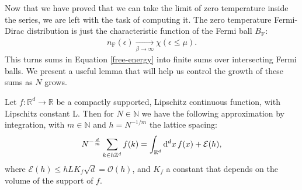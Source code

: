 Now that we have proved that we can take the limit of zero temperature inside the series, we
are left with the task of computing it. The zero temperature Fermi-Dirac distribution is just
the characteristic function of the Fermi ball $B_{\mathrm{F}}$:
\begin{align*}
	n_{\mathrm{F}}(\epsilon) \xrightarrow[\beta\to\infty]{} \chi(\epsilon\leq\mu).
\end{align*}
This turns sums in Equation \eqref{free-energy} into finite sums over intersecting Fermi
balls. We present a useful lemma that will help us control the growth of these sums as $N$
grows.

\begin{lemma}
	\label{riemann}
	Let $f:\mathbb{R}^d\to\mathbb{R}$ be a compactly supported, Lipschitz continuous function,
	with Lipschitz constant L. Then for $N\in\mathbb{N}$ we have the following approximation
	by integration, with $m\in\mathbb{N}$ and $h=N^{-1/m}$ the lattice spacing:
	\begin{align*}
		N^{-\frac{d}{m}}\sum_{k\in h\mathbb{Z}^d} f(k)
		= \int_{\mathbb{R}^d}\mathrm{d}^dx\,f(x) + \mathcal{E}(h),
	\end{align*}
	where $\mathcal{E}(h)\leq hLK_f\sqrt{d} = \mathcal{O}(h)$, and $K_f$ a constant that
	depends on the volume of the support of $f$.
\end{lemma}
